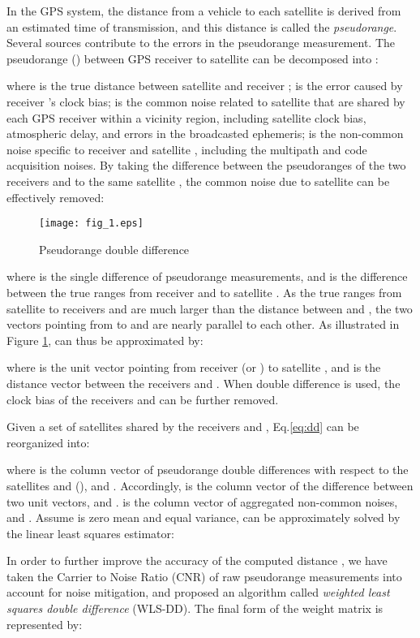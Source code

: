 \documentclass[letterpaper, 10 pt, conference]{ieeeconf}
\begin{document}
In the GPS system, the distance from a vehicle to each satellite is derived from an estimated time of transmission, and this distance is called the \emph{pseudorange}. Several sources contribute to the errors in the pseudorange measurement. The pseudorange () between GPS receiver   to satellite   can be decomposed into \cite{kaplan2006understanding}:

where  is the true distance between satellite   and receiver ;   is the error caused by receiver  's clock bias;   is the common noise related to satellite   that are shared by each GPS receiver within a vicinity region, including satellite clock bias,  atmospheric delay, and errors in the broadcasted ephemeris;   is the non-common noise specific to receiver   and satellite  , including the multipath and code acquisition noises. By taking the difference between the pseudoranges of the two receivers  and   to the same satellite  , the common noise due to satellite  can be effectively removed:


\begin{figure}
\centering
\texttt{[image: fig\_1.eps]}
\caption{Pseudorange double difference}
\label{fig:1}
\end{figure}
\noindent where  is the single difference of pseudorange measurements, and  is the difference between the true ranges from receiver  and    to satellite  . As the true ranges from  satellite  to receivers   and    are much larger than the distance between   and  , the two vectors pointing from   to  and   are nearly parallel to each other. As illustrated in Figure \ref{fig:1},   can thus be approximated by:

where  is the unit vector pointing from receiver  (or ) to satellite , and  is the distance vector between the receivers  and . When double difference is used, the clock bias of the receivers   and   can be further removed.


Given a set of satellites  shared by the receivers  and , Eq.\ref{eq:dd}  can be reorganized into:

where  is the column vector of pseudorange double differences with respect to the satellites  and  (), and . Accordingly,  is the column vector of the difference between two unit vectors, and .   is the column vector of aggregated non-common noises, and  . Assume  is zero mean and equal variance,  can be approximately solved by the linear least squares estimator:


In order to further improve the accuracy of the computed distance , we have taken the Carrier to Noise Ratio (CNR) of raw pseudorange measurements into account for noise mitigation, and proposed an algorithm called  \emph{weighted least squares double difference }(WLS-DD). The final form of the weight matrix  is represented by:
\end{document}
